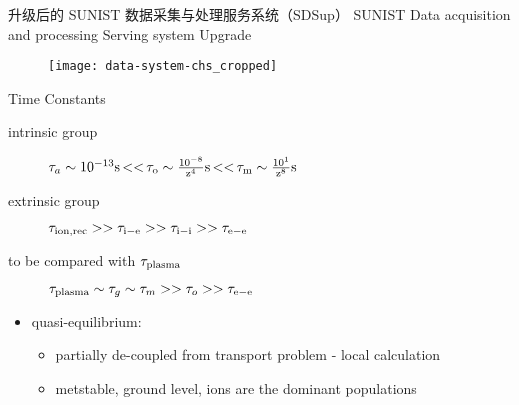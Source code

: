 \begin{CJK*}{UTF8}{kai}
\begin{frame}{升级后的 SUNIST 数据采集与处理服务系统（SDSup）}
  \centering
  \alert{S}UNIST \alert{D}ata acquisition and processing \alert{S}erving system \alert{Up}grade
  \begin{figure}
      \texttt{[image: data-system-chs\_cropped]}
  \end{figure}
\end{frame}

\begin{frame}{Time Constants}
	\begin{description}
		\item[intrinsic group]
			$\tau_a\sim 10^{-13}\rm{s}\,{<<}\,
				\tau_o\sim \frac{10^{-8}}{z^4}\rm{s}\,{<<}\,
				\tau_m\sim \frac{10^{1}}{z^8}\rm{s}$
		\item[extrinsic group]
			$\tau_{\rm{ion, rec}}>>\tau_{\rm{i-e}}>>\tau_{\rm{i-i}}>>\tau_{\rm{e-e}}$
		\item[to be compared with $\tau_{\rm{plasma}}$]
			$\tau_{\rm{plasma}}\sim\tau_{g}\sim\tau_{m}>>\tau_{o}>>\tau_{\rm{e-e}}$
	\end{description}
	\begin{itemize}
		\item quasi-equilibrium:
			\begin{itemize}
				\item partially de-coupled from transport problem - local calculation
				\item metstable, ground level, ions are the dominant populations
			\end{itemize}
	\end{itemize}
\end{frame}


\end{CJK*}
